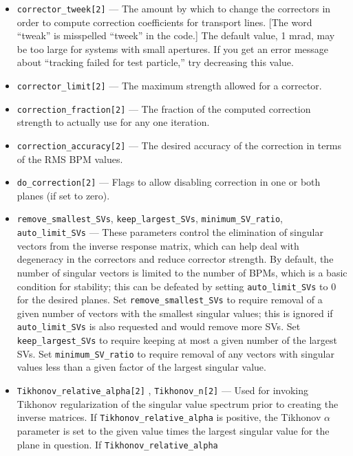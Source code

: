 \documentclass[11pt]{article}
\begin{document}
\begin{itemize}
  errors are the residual after correction, and include the effects of offsets (\verb|DX| and \verb|DY|), setpoints
  (\verb|XSETPOINT|, \verb|YSETPOINT|, and \verb|SETPOINT|), and tilts (\verb|TILT|).
  Recommended value: ``\%s.bpm''.
\item \verb|corrector_tweek[2]| --- The amount by which to change the correctors in order to compute correction coefficients for
transport lines.
[The word ``tweak'' is misspelled ``tweek'' in the code.]   The default value, 1 mrad, may be too large for systems with
small apertures.  If you get an error message about ``tracking failed for test particle,'' try decreasing this value.
\item \verb|corrector_limit[2]| --- The maximum strength allowed for a corrector.
\item \verb|correction_fraction[2]| --- The fraction of the computed correction strength to actually use for any one iteration.
\item \verb|correction_accuracy[2]| --- The desired accuracy of the correction in terms of the RMS BPM values.
\item \verb|do_correction[2]| --- Flags to allow disabling correction in one or both planes (if set to zero).
\item \verb|remove_smallest_SVs|, \verb|keep_largest_SVs|, \verb|minimum_SV_ratio|, \verb|auto_limit_SVs| --- These parameters control the elimination of
  singular vectors from the inverse response matrix, which can help deal with degeneracy in the correctors and reduce corrector strength.
  By default, the number of singular vectors is limited to the number of BPMs, which is a basic condition for stability; this can be defeated by
  setting \verb|auto_limit_SVs| to 0 for the desired planes.  Set \verb|remove_smallest_SVs| to require removal of a given number of
  vectors with the smallest singular values; this is ignored if \verb|auto_limit_SVs| is also requested and would remove more SVs. 
  Set \verb|keep_largest_SVs| to require keeping at most a given number of the largest SVs.
  Set \verb|minimum_SV_ratio| to require removal of any vectors with singular values less than a given factor of the largest singular value.
\item \verb|Tikhonov_relative_alpha[2]| , \verb|Tikhonov_n[2]| --- Used for invoking Tikhonov regularization of the singular
  value spectrum prior to creating the inverse matrices. If \verb|Tikhonov_relative_alpha| is positive, the Tikhonov $\alpha$
  parameter is set to the given value times the largest singular value for the plane in question. If \verb|Tikhonov_relative_alpha|

\end{itemize}
\end{document}
